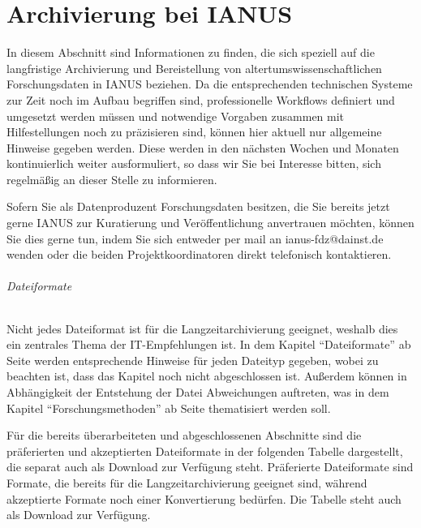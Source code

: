 \chapter{Archivierung bei IANUS}
	\label{archivierungIANUS}
In diesem Abschnitt sind Informationen zu finden, die sich speziell auf die langfristige Archivierung und Bereistellung von altertumswissenschaftlichen Forschungsdaten in IANUS beziehen. Da die entsprechenden technischen Systeme zur Zeit noch im Aufbau begriffen sind, professionelle Workflows definiert und umgesetzt werden müssen und notwendige Vorgaben zusammen mit Hilfestellungen noch zu präzisieren sind, können hier aktuell nur allgemeine Hinweise gegeben werden. Diese werden in den nächsten Wochen und Monaten kontinuierlich weiter ausformuliert, so dass wir Sie bei Interesse bitten, sich regelmäßig an dieser Stelle zu informieren.

Sofern Sie als Datenproduzent Forschungsdaten besitzen, die Sie bereits jetzt gerne IANUS zur Kuratierung und Veröffentlichung anvertrauen möchten, können Sie dies gerne tun, indem Sie sich entweder per mail an ianus-fdz@dainst.de wenden oder die beiden Projektkoordinatoren direkt telefonisch kontaktieren.

\subparagraph{Dateiformate}
Nicht jedes Dateiformat ist für die Langzeitarchivierung geeignet, weshalb dies ein zentrales Thema der IT-Empfehlungen ist. In dem Kapitel "`Dateiformate"' ab Seite \pageref{dateiformate} werden entsprechende Hinweise für jeden Dateityp gegeben, wobei zu beachten ist, dass das Kapitel noch nicht abgeschlossen ist. Außerdem können in Abhängigkeit der Entstehung der Datei Abweichungen auftreten, was in dem Kapitel "`Forschungsmethoden"' ab Seite \pageref{methoden} thematisiert werden soll.

Für die bereits überarbeiteten und abgeschlossenen Abschnitte sind die präferierten und akzeptierten Dateiformate in der folgenden Tabelle dargestellt, die separat auch als Download zur Verfügung steht. Präferierte Dateiformate sind Formate, die bereits für die Langzeitarchivierung geeignet sind, während akzeptierte Formate noch einer Konvertierung bedürfen. Die Tabelle steht auch als Download zur Verfügung.


